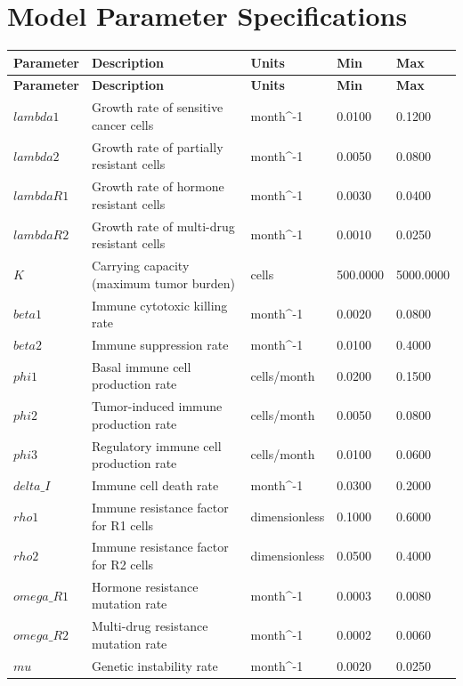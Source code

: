 \documentclass{article}
\begin{document}
\section{Model Parameter Specifications}

\begin{longtable}{|p{3cm}|p{6cm}|p{2cm}|p{1.5cm}|p{1.5cm}|}
\hline
\textbf{Parameter} & \textbf{Description} & \textbf{Units} & \textbf{Min} & \textbf{Max} \\
\hline
\endfirsthead
\hline
\textbf{Parameter} & \textbf{Description} & \textbf{Units} & \textbf{Min} & \textbf{Max} \\
\hline
\endhead
$lambda1$ & Growth rate of sensitive cancer cells & month^{-1} & 0.0100 & 0.1200 \\
\hline
$lambda2$ & Growth rate of partially resistant cells & month^{-1} & 0.0050 & 0.0800 \\
\hline
$lambdaR1$ & Growth rate of hormone resistant cells & month^{-1} & 0.0030 & 0.0400 \\
\hline
$lambdaR2$ & Growth rate of multi-drug resistant cells & month^{-1} & 0.0010 & 0.0250 \\
\hline
$K$ & Carrying capacity (maximum tumor burden) & cells & 500.0000 & 5000.0000 \\
\hline
$beta1$ & Immune cytotoxic killing rate & month^{-1} & 0.0020 & 0.0800 \\
\hline
$beta2$ & Immune suppression rate & month^{-1} & 0.0100 & 0.4000 \\
\hline
$phi1$ & Basal immune cell production rate & cells/month & 0.0200 & 0.1500 \\
\hline
$phi2$ & Tumor-induced immune production rate & cells/month & 0.0050 & 0.0800 \\
\hline
$phi3$ & Regulatory immune cell production rate & cells/month & 0.0100 & 0.0600 \\
\hline
$delta\_I$ & Immune cell death rate & month^{-1} & 0.0300 & 0.2000 \\
\hline
$rho1$ & Immune resistance factor for R1 cells & dimensionless & 0.1000 & 0.6000 \\
\hline
$rho2$ & Immune resistance factor for R2 cells & dimensionless & 0.0500 & 0.4000 \\
\hline
$omega\_R1$ & Hormone resistance mutation rate & month^{-1} & 0.0003 & 0.0080 \\
\hline
$omega\_R2$ & Multi-drug resistance mutation rate & month^{-1} & 0.0002 & 0.0060 \\
\hline
$mu$ & Genetic instability rate & month^{-1} & 0.0020 & 0.0250 \\

\end{longtable}
\end{document}
